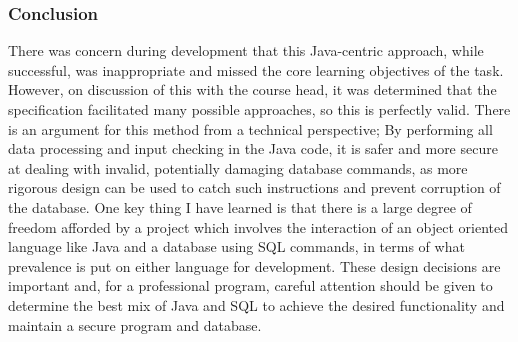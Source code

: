 \documentclass[12pt, oneside]{article}
\begin{document}
\subsubsection*{Conclusion}
There was concern during development that this Java-centric approach, while successful, was inappropriate and missed the core learning objectives of the task. However, on discussion of this with the course head, it was determined that the specification facilitated many possible approaches, so this is perfectly valid. There is an argument for this method from a technical perspective; By performing all data processing and input checking in the Java code, it is safer and more secure at dealing with invalid, potentially damaging database commands, as more rigorous design can be used to catch such instructions and prevent corruption of the database.\newline \newline
One key thing I have learned is that there is a large degree of freedom afforded by a project which involves the interaction of an object oriented language like Java and a database using SQL commands, in terms of what prevalence is put on either language for development. These design decisions are important and, for a professional program, careful attention should be given to determine the best mix of Java and SQL to achieve the desired functionality and maintain a secure program and database.
\end{document}
